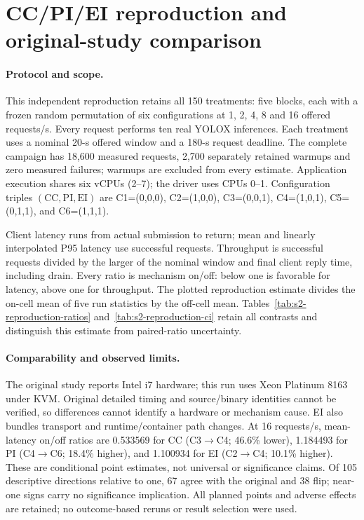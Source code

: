 \clearpage
\section*{CC/PI/EI reproduction and original-study comparison}
\label{sec:s2-reproduction}
\paragraph{Protocol and scope.}
This independent reproduction retains all 150 treatments: five blocks, each with a frozen random permutation of six configurations at 1, 2, 4, 8 and 16 offered requests/s. Every request performs ten real YOLOX inferences. Each treatment uses a nominal 20-s offered window and a 180-s request deadline. The complete campaign has 18,600 measured requests, 2,700 separately retained warmups and zero measured failures; warmups are excluded from every estimate. Application execution shares six vCPUs (2--7); the driver uses CPUs 0--1. Configuration triples $(\mathrm{CC},\mathrm{PI},\mathrm{EI})$ are C1=(0,0,0), C2=(1,0,0), C3=(0,0,1), C4=(1,0,1), C5=(0,1,1), and C6=(1,1,1).

Client latency runs from actual submission to return; mean and linearly interpolated P95 latency use successful requests. Throughput is successful requests divided by the larger of the nominal window and final client reply time, including drain. Every ratio is mechanism on/off: below one is favorable for latency, above one for throughput. The plotted reproduction estimate divides the on-cell mean of five run statistics by the off-cell mean. Tables~\ref{tab:s2-reproduction-ratios} and~\ref{tab:s2-reproduction-ci} retain all contrasts and distinguish this estimate from paired-ratio uncertainty.

\paragraph{Comparability and observed limits.}
The original study reports Intel i7 hardware; this run uses Xeon Platinum 8163 under KVM. Original detailed timing and source/binary identities cannot be verified, so differences cannot identify a hardware or mechanism cause. EI also bundles transport and runtime/container path changes. At 16 requests/s, mean-latency on/off ratios are 0.533569 for CC (C3$\to$C4; 46.6\% lower), 1.184493 for PI (C4$\to$C6; 18.4\% higher), and 1.100934 for EI (C2$\to$C4; 10.1\% higher). These are conditional point estimates, not universal or significance claims. Of 105 descriptive directions relative to one, 67 agree with the original and 38 flip; near-one signs carry no significance implication. All planned points and adverse effects are retained; no outcome-based reruns or result selection were used.

